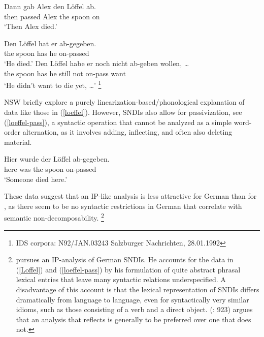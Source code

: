 \documentclass[output=paper]{langsci/langscibook}
\begin{document}
\begin{exe}
\ex\label{loeffel-v2} \label{Loffel} \label{loeffel}
\gll Dann gab Alex den L\"offel ab.\\
     then passed Alex the spoon on\\
\glt `Then Alex died.'
\end{exe}


\ea
\ea\label{loeffel-vf0}
\gll Den L\"offel hat er ab-gegeben. \\
the spoon has he {on-passed}\\
\glt `He died.'\label{loeffel-vf}
\ex
\gll Den L\"offel habe er noch nicht ab-geben wollen, \ldots\\
the spoon has he still not on-pass want\\
\glt `He didn't want to die yet, \ldots'%
\footnote{IDS corpora: N92/JAN.03243 Salzburger Nachrichten, 28.01.1992}\label{loeffel-vf1}
\z
\z

NSW briefly explore a purely linearization-based/phonological explanation of data like those in (\ref{loeffel}). However,   SNDIs also allow for  passivization, see (\ref{loeffel-pass}), a syntactic operation that cannot be analyzed as a simple word-order alternation, as it involves adding, inflecting, and often also deleting material.

\ea
\gll Hier wurde der L\"offel ab-gegeben. \\
here was the spoon on-passed \\
\glt `Someone died here.' \label{loeffel-pass}
\z

These data suggest that an IP-like analysis is less attractive for German than for , as there seem to be no syntactic restrictions in German that correlate with  
semantic non-decomposability.%
\footnote{\cite{Soehn:diss} pursues an IP-analysis of  German SNDIs. He accounts for the data in (\ref{Loffel}) and (\ref{loeffel-pass}) by his formulation of quite abstract phrasal lexical entries that leave many syntactic relations underspecified. A disadvantage of this account is that the lexical representation of SNDIs differs dramatically from language to language, even for syntactically very similar idioms, such as those consisting of a verb and a direct object. \citeauthor{Mueller:13Unifying} (\citeyear{Mueller:13Unifying}: 923) argues that an analysis that reflects  is generally to be preferred over one that does not.}
\end{document}
